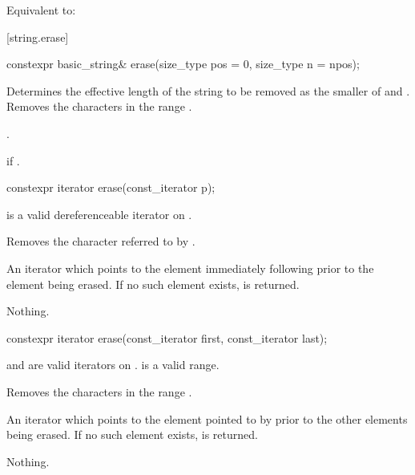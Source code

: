 \begin{itemdescr}
\pnum
\effects
Equivalent to: 
\end{itemdescr}

[string.erase]{}

%
\begin{itemdecl}
constexpr basic_string& erase(size_type pos = 0, size_type n = npos);
\end{itemdecl}

\begin{itemdescr}
\pnum
\effects
Determines the effective length 
of the string to be removed as the smaller of  and
.
Removes the characters in the range .

\pnum
\returns
{}.

\pnum
\throws
{}
if 
.
\end{itemdescr}

%
\begin{itemdecl}
constexpr iterator erase(const_iterator p);
\end{itemdecl}

\begin{itemdescr}
\pnum
\expects
{} is a valid dereferenceable iterator on .

\pnum
\effects
Removes the character referred to by .

\pnum
\returns
An iterator which points to the element immediately following  prior to
the element being erased.
If no such element exists,
is returned.

\pnum
\throws
Nothing.
\end{itemdescr}

%
\begin{itemdecl}
constexpr iterator erase(const_iterator first, const_iterator last);
\end{itemdecl}

\begin{itemdescr}
\pnum
\expects
{} and  are valid iterators on
.  is a valid range.

\pnum
\effects
Removes the characters in the range
.

\pnum
\returns
An iterator which points to the element pointed to by  prior to
the other elements being erased.
If no such element exists,
is returned.

\pnum
\throws
Nothing.
\end{itemdescr}

